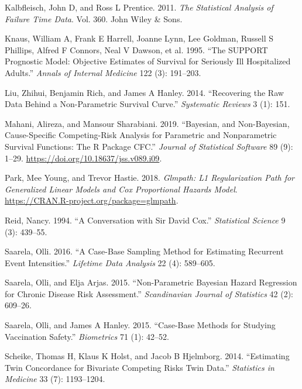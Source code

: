 \begin{CSLReferences}{1}{0}
\leavevmode{}%
Kalbfleisch, John D, and Ross L Prentice. 2011. \emph{The Statistical Analysis of Failure Time Data}. Vol. 360. John Wiley \& Sons.

\leavevmode{}%
Knaus, William A, Frank E Harrell, Joanne Lynn, Lee Goldman, Russell S Phillips, Alfred F Connors, Neal V Dawson, et al. 1995. {``The SUPPORT Prognostic Model: Objective Estimates of Survival for Seriously Ill Hospitalized Adults.''} \emph{Annals of Internal Medicine} 122 (3): 191--203.

\leavevmode{}%
Liu, Zhihui, Benjamin Rich, and James A Hanley. 2014. {``Recovering the Raw Data Behind a Non-Parametric Survival Curve.''} \emph{Systematic Reviews} 3 (1): 151.

\leavevmode{}%
Mahani, Alireza, and Mansour Sharabiani. 2019. {``Bayesian, and Non-{B}ayesian, Cause-Specific Competing-Risk Analysis for Parametric and Nonparametric Survival Functions: The {R} Package {CFC}.''} \emph{Journal of Statistical Software} 89 (9): 1--29. \url{https://doi.org/10.18637/jss.v089.i09}.

\leavevmode{}%
Park, Mee Young, and Trevor Hastie. 2018. \emph{Glmpath: L1 Regularization Path for Generalized Linear Models and Cox Proportional Hazards Model}. \url{https://CRAN.R-project.org/package=glmpath}.

\leavevmode{}%
Reid, Nancy. 1994. {``A Conversation with Sir David Cox.''} \emph{Statistical Science} 9 (3): 439--55.

\leavevmode{}%
Saarela, Olli. 2016. {``A Case-Base Sampling Method for Estimating Recurrent Event Intensities.''} \emph{Lifetime Data Analysis} 22 (4): 589--605.

\leavevmode{}%
Saarela, Olli, and Elja Arjas. 2015. {``Non-Parametric {B}ayesian Hazard Regression for Chronic Disease Risk Assessment.''} \emph{Scandinavian Journal of Statistics} 42 (2): 609--26.

\leavevmode{}%
Saarela, Olli, and James A Hanley. 2015. {``Case-Base Methods for Studying Vaccination Safety.''} \emph{Biometrics} 71 (1): 42--52.

\leavevmode{}%
Scheike, Thomas H, Klaus K Holst, and Jacob B Hjelmborg. 2014. {``Estimating Twin Concordance for Bivariate Competing Risks Twin Data.''} \emph{Statistics in Medicine} 33 (7): 1193--1204.


\end{CSLReferences}
